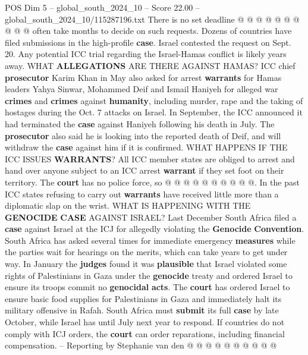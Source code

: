 \begin{textsample}{POS Dim 5 – global\_south\_2024\_10 – Score 22.00 – global\_south\_2024\_10/115287196.txt}
There is no set deadline @ @ @ @ @ @ @ @ @ @ often take months to decide on such requests.
Dozens of countries have filed submissions in the high-profile \textbf{case}.
Israel contested the request on Sept. 20.
Any potential ICC trial regarding the Israel-Hamas conflict is likely years away.
WHAT \textbf{ALLEGATIONS} ARE THERE AGAINST HAMAS?
ICC chief \textbf{prosecutor} Karim Khan in May also asked for arrest \textbf{warrants} for Hamas leaders Yahya Sinwar, Mohammed Deif and Ismail Haniyeh for alleged war \textbf{crimes} and \textbf{crimes} against \textbf{humanity}, including murder, rape and the taking of hostages during the Oct. 7 attacks on Israel.
In September, the ICC announced it had terminated the \textbf{case} against Haniyeh following his death in July.
The \textbf{prosecutor} also said he is looking into the reported death of Deif, and will withdraw the \textbf{case} against him if it is confirmed.
WHAT HAPPENS IF THE ICC ISSUES \textbf{WARRANTS}?
All ICC member states are obliged to arrest and hand over anyone subject to an ICC arrest \textbf{warrant} if they set foot on their territory.
The \textbf{court} has no police force, so @ @ @ @ @ @ @ @ @ @.
In the past ICC states refusing to carry out \textbf{warrants} have received little more than a diplomatic slap on the wrist.
WHAT IS HAPPENING WITH THE \textbf{GENOCIDE} \textbf{CASE} AGAINST ISRAEL?
Last December South Africa filed a \textbf{case} against Israel at the ICJ for allegedly violating the \textbf{Genocide} \textbf{Convention}.
South Africa has asked several times for immediate emergency \textbf{measures} while the parties wait for hearings on the merits, which can take years to get under way.
In January the \textbf{judges} found it was \textbf{plausible} that Israel violated some rights of Palestinians in Gaza under the \textbf{genocide} treaty and ordered Israel to ensure its troops commit no \textbf{genocidal} \textbf{acts}.
The \textbf{court} has ordered Israel to ensure basic food supplies for Palestinians in Gaza and immediately halt its military offensive in Rafah.
South Africa must \textbf{submit} its full \textbf{case} by late October, while Israel has until July next year to respond.
If countries do not comply with ICJ orders, the \textbf{court} can order reparations, including financial compensation. -- Reporting by Stephanie van den @ @ @ @ @ @ @ @ @ @

\end{textsample}
